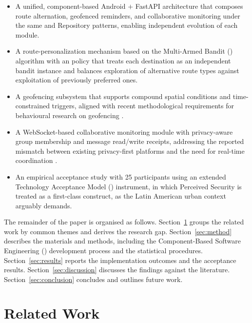 \documentclass[a4paper,fleqn]{cas-sc}
\begin{document}
	\begin{itemize}
		\item A unified, component-based Android $+$ FastAPI architecture that composes route alternation, geofenced reminders, and collaborative monitoring under the same \MVVM{} and Repository patterns, enabling independent evolution of each module.
		\item A route-personalization mechanism based on the Multi-Armed Bandit (\MAB{}) algorithm with an \UCB{} policy that treats each destination as an independent bandit instance and balances exploration of alternative route types against exploitation of previously preferred ones.
		\item A geofencing subsystem that supports compound spatial conditions and time-constrained triggers, aligned with recent methodological requirements for behavioural research on geofencing \citep{shevchenko2024geofencing}.
		\item A WebSocket-based collaborative monitoring module with privacy-aware group membership and message read/write receipts, addressing the reported mismatch between existing privacy-first platforms and the need for real-time coordination \citep{li2017locsharing,mckenzie2022privyto}.
		\item An empirical acceptance study with 25 participants using an extended Technology Acceptance Model (\TAM{}) instrument, in which Perceived Security is treated as a first-class construct, as the Latin American urban context arguably demands.
	\end{itemize}
	
	The remainder of the paper is organised as follows. Section~\ref{sec:related} groups the related work by common themes and derives the research gap. Section~\ref{sec:method} describes the materials and methods, including the Component-Based Software Engineering (\CBSE{}) development process and the statistical procedures. Section~\ref{sec:results} reports the implementation outcomes and the acceptance results. Section~\ref{sec:discussion} discusses the findings against the literature. Section~\ref{sec:conclusion} concludes and outlines future work.
	
	\section{Related Work}\label{sec:related}
	
\end{document}
